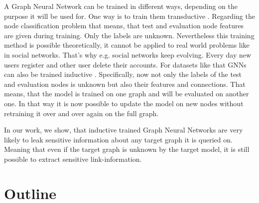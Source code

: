 		A Graph Neural Network can be trained in different ways, depending on the purpose it will be used for.
		One way is to train them transductive \cite{5206871, ZHA2010187, WANG2017218, 10.1007/978-3-642-04174-7_29}.
		Regarding the node classification problem that means, that test and evaluation node features are given during training.
		Only the labels are unknown.
		Nevertheless this training method is possible theoretically, it cannot be applied to real world problems like in social networks.
		That's why e.g. social networks keep evolving.
		Every day new users register and other user delete their accounts.
		For datasets like that GNNs can also be trained inductive \cite{zeng2020graphsaint, 8519335, zhang2020document}.
		Specifically, now not only the labels of the test and evaluation nodes is unknown but also their features and connections.
		That means, that the model is trained on one graph and will be evaluated on another one.
		In that way it is now possible to update the model on new nodes without retraining it over and over again on the full graph.

		In our work, we show, that inductive trained Graph Neural Networks are very likely to leak sensitive information about any target graph it is queried on. 
		Meaning that even if the target graph is unknown by the target model, it is still possible to extract sensitive link-information.

	\section{Outline}
